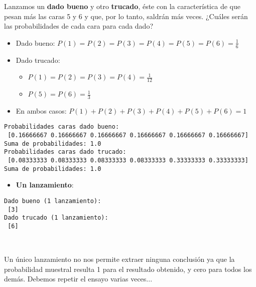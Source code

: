 \documentclass[11pt]{article}
\providecommand{\tightlist}{%
      \setlength{\itemsep}{0pt}\setlength{\parskip}{0pt}}
\begin{document}
Lanzamos un \textbf{dado bueno} y otro \textbf{trucado}, éste con la
característica de que pesan más las caras 5 y 6 y que, por lo tanto,
saldrán más veces. ¿Cuáles serán las probabilidades de cada cara para
cada dado? 
\begin{itemize}
\item Dado bueno: \(P(1)=P(2)=P(3)=P(4)=P(5)=P(6)=\frac{1}{6}\) 
\item Dado trucado: 
\begin{itemize}
\item \(P(1)=P(2)=P(3)=P(4)=\frac{1}{12}\) 
\item \(P(5)=P(6)=\frac{1}{3}\)
\end{itemize} 
\item En ambos casos:
\(P(1)+P(2)+P(3)+P(4)+P(5)+P(6)=1\)
\end{itemize}

    \begin{Verbatim}[commandchars=\\\{\}]
Probabilidades caras dado bueno:
 [0.16666667 0.16666667 0.16666667 0.16666667 0.16666667 0.16666667]
Suma de probabilidades: 1.0
Probabilidades caras dado trucado:
 [0.08333333 0.08333333 0.08333333 0.08333333 0.33333333 0.33333333]
Suma de probabilidades: 1.0

    \end{Verbatim}

    \begin{itemize}
\tightlist
\item
  \textbf{Un lanzamiento}:
\end{itemize}

    \begin{Verbatim}[commandchars=\\\{\}]
Dado bueno (1 lanzamiento):
 [3]
Dado trucado (1 lanzamiento):
 [6]

    \end{Verbatim}

    \begin{center}
    \end{center}
    { \hspace*{\fill} \\}
    
    Un único lanzamiento no nos permite extraer ninguna conclusión ya que la
probabilidad muestral resulta 1 para el resultado obtenido, y cero para
todos los demás. Debemos repetir el ensayo varias veces...
\end{document}
